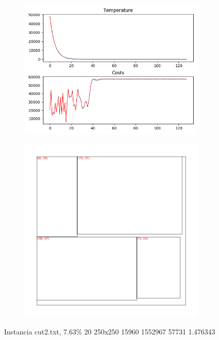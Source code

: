 \begin{figure}
\centering
\begin{subfigure}{.5\textwidth}
  \centering
  \includegraphics[width=1\linewidth]{results/cut2/2/plot}
  \label{fig:sub1}
\end{subfigure}%
\begin{subfigure}{.5\textwidth}
  \centering
  \includegraphics[width=1\linewidth]{results/cut2/2/cut}
  \label{fig:sub2}
\end{subfigure}
\caption{Instancia cut2.txt, 7.63\% 20 250x250 15960 1552967 57731 1.476343}
\label{fig:test}
\end{figure}


